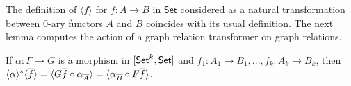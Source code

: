 \documentclass[runningheads]{llncs}
\newcommand{\set}{\mathsf{Set}}
\renewcommand{\id}{\mathit{id}}
\renewcommand{\id}{\mathit{id}}
\begin{document}
\begin{comment}
We also note that if $f : A \to B$ is a function seen as a natural
transformation between 0-ary functors, then $\graph{f}$ is (the 0-ary
relation transformer associated with) the graph relation of $f$.
Indeed, we need to apply Definition~\ref{definition:graph-nat-transf} with $k
= 0$, i.e., to the degenerate relation $\ast : \rel(\ast, \ast)$.  As
degenerate $0$-ary functors, $A$ and $B$ are constant functors, i.e.,
$A\, \ast = A$ and $B\, \ast = B$.  By the universal property of the
product, there exists a unique $h$ making the diagram
\[ \begin{tikzcd}[row sep = large]
        A
        &A
        \ar[l, equal]
        \ar[r, equal]
        \ar[d, dashed, "{h}"]
        &A
        \ar[r, "{f}"]
        &B \\
        &A \times B
        \ar[ul, "{\pi_1}"] \ar[urr, "{\pi_2}"']
\end{tikzcd}\]
commute. Since $\iota_\ast : \ast \to \ast$ is the identity on $\ast$,
and $A\, \id_{\ast} = \id_{A}$, we have $h_{\ast} = h$.  Moreover,
$h_{\overline{A \times B}} = \langle \id_{A}, f \rangle$ is a
monomorphism in $\set$ because $\id_{A}$ is.  Then,
$\iota_{f^\wedge\ast} = \langle \id_{A}, f \rangle$ and $f^\wedge\ast
= A$, from which we deduce that $\iota_{f^\wedge\ast} f^\wedge\ast =
\langle \id_{A}, f \rangle\, A = \graph{f}^*$. This ensures that the
graph of $f$ as a 0-ary natural transformation coincides with the
graph of $f$ as a morphism in $\set$, and so that
Definition~\ref{dfn:graph-nat-transf} is a reasonable generalization
of Definition~\ref{def:graph}.

Just as the equality relation $\Eq_B$ on a set $B$ coincides with
$\graph{\id_B}$, the graph of the identity on the set, so we can
define the equality relation transformer to be the graph of the
identity natural transformation. This gives

\begin{definition}
Let $F : [\set^k, \set]$.  The equality relation transformer on $F$ is
defined to be $\Eq_F = \graph{\id_{F}}$. This entails that $Eq_F = (F,
F, \Eq_F^*)$ with $\Eq_F^* = \graph{\id_{F}}^*$.
\end{definition}
\end{comment}

\noindent
The definition of $\langle f \rangle$ for $f : A \to B$
in $\set$ considered as a natural transformation between $0$-ary
functors $A$ and $B$ coincides with its usual definition.
The next lemma computes the action of a graph relation
transformer on graph relations.
\begin{lemma}\label{lem:eq-reln-equalities}
If $\alpha : F \to G$ is a morphism in $[\mathsf{Set}^k, \mathsf{Set}]$
and $f_1: A_1 \to B_1, ..., f_k : A_k \to B_k$,
then $\langle {\alpha} \rangle^* \langle {\overline{f}} \rangle
= \langle G \overline{f} \circ \alpha_{\overline{A}} \rangle
= \langle \alpha_{\overline{B}} \circ F \overline{f} \rangle$.
\end{lemma}
\end{document}
